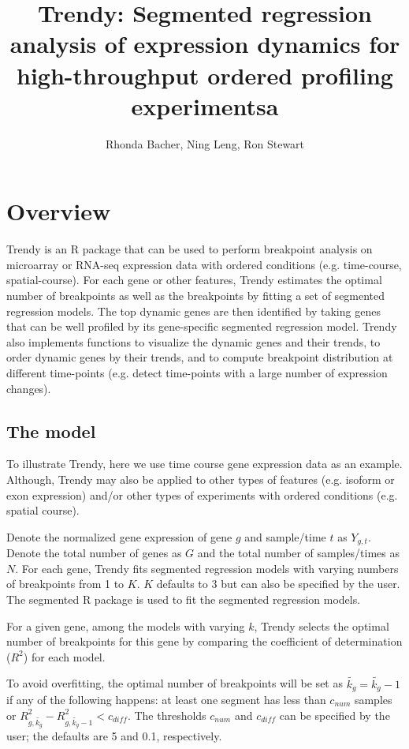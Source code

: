 \documentclass{article}\usepackage[]{graphicx}\usepackage[usenames,dvipsnames]{color}
\begin{document}
\title{Trendy: Segmented regression analysis of
expression dynamics for high-throughput ordered
profiling experimentsa}
\author{Rhonda Bacher, Ning Leng, Ron Stewart}
\maketitle
\tableofcontents
\setcounter{tocdepth}{2}



\section{Overview}
\label{sec:intro}
Trendy is an R package that can be used to perform breakpoint analysis on microarray or RNA-seq expression data with ordered conditions (e.g. time-course, spatial-course).
For each gene or other features, Trendy estimates the optimal number of breakpoints as well as
the breakpoints by fitting a set of segmented regression models.
The top dynamic genes are then identified by taking genes that can be well profiled by its gene-specific segmented regression model. Trendy also implements functions to visualize the dynamic genes and their trends, to order 
dynamic genes by their trends, and to compute breakpoint distribution at different
time-points (e.g. detect time-points with a large number of expression changes).

\subsection{The model}
To illustrate Trendy, here we use time course gene expression data as an example. 
Although, Trendy may also be applied to other types of features (e.g. isoform or exon expression) and/or other
types of experiments with ordered conditions (e.g. spatial course).

Denote the normalized gene expression of gene $g$ and sample/time $t$ as $Y_{g,t}$.
Denote the total number of genes as $G$ and the total number of samples/times as $N$.
For each gene, Trendy fits segmented regression models with varying numbers of breakpoints from 1 to $K$. $K$ defaults to 3 but can also
be specified by the user. The segmented R package is used to fit the segmented regression models.

For a given gene, among the models with varying $k$, Trendy selects the optimal
number of breakpoints for this gene by comparing the coefficient of determination ($R^2$) for each model.

To avoid overfitting, the optimal number of breakpoints will be set as
$\tilde{k_g} = \tilde{k_g} -1$ if any of the following happens:
at least one segment has less than $c_{num}$ samples
or $R^{2}_{g,\tilde{k_g}} - R^{2}_{g,\tilde{k_g}-1} < c_{diff}$. The thresholds
$c_{num}$ and $c_{diff}$ can be specified by the user; the 
defaults are 5 and 0.1,
respectively.
\end{document}
